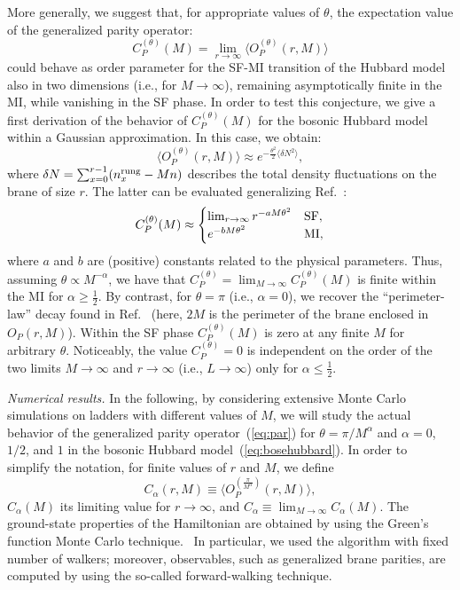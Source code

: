 \documentclass[aps,prb,floatfix,twocolumn,amsmath,amssymb]{revtex4}
\begin{document}
More generally, we suggest that, for appropriate values of $\theta$, the expectation value of the generalized parity operator:
\begin{equation}\label{eq:par}
C_P^{(\theta)}(M) = \lim_{r \to \infty} \langle O_P^{(\theta)} (r,M)\rangle
\end{equation}
could behave as order parameter for the SF-MI transition of the Hubbard model also in two dimensions (i.e., for $M \to \infty$), 
remaining asymptotically finite in the MI, while vanishing in the SF phase. In order to test this conjecture, we give a first 
derivation of the behavior of $C_P^{(\theta)}(M)$ for the bosonic Hubbard model within a Gaussian approximation. In this case, 
we obtain:
\begin{equation}\label{NLP2D}
\langle O_P^{(\theta)} (r,M) \rangle \approx e^{-\frac{\theta^2}{2}\langle\delta N^2\rangle},
\end{equation}
where $\delta N=\sum_{x=0}^{r-1}(n_x^{\rm rung}-Mn)$ describes the total density fluctuations on the brane of size $r$. 
The latter can be evaluated generalizing Ref.~:
\begin{equation}
\label{eq:Gauss}
C_P^{(\theta)}(M) \approx
\begin{cases} 
\lim_{r\to \infty} r^{-a M \theta^2} & {\rm SF}, \\
e^{-b M \theta^2}                    & {\rm MI},
\end{cases}
\end{equation}
where $a$ and $b$ are (positive) constants related to the physical parameters. Thus, assuming $\theta \propto M^{-\alpha}$, we
have that $C_P^{(\theta)} = \lim_{M \to \infty} C_P^{(\theta)}(M)$ is finite within the MI for $\alpha \ge \frac{1}{2}$. By contrast, 
for $\theta=\pi$ (i.e., $\alpha=0$), we recover the ``perimeter-law'' decay found in Ref.~ (here, $2M$ is 
the perimeter of the brane enclosed in $O_P(r,M)$). Within the SF phase $C_P^{(\theta)}(M)$ is zero at any finite $M$ for arbitrary 
$\theta$. Noticeably, the value $C_P^{(\theta)}=0$ is independent on the order of the two limits $M \to \infty$ and $r \to \infty$
(i.e., $L \to \infty$) only for $\alpha \leq \frac{1}{2}$.

{\it Numerical results.} In the following, by considering extensive Monte Carlo simulations on ladders with different values of $M$, we 
will study the actual behavior of the generalized parity operator~(\ref{eq:par}) for $\theta=\pi/M^{\alpha}$ and $\alpha=0$, $1/2$, and
$1$ in the bosonic Hubbard model~(\ref{eq:bosehubbard}). In order to simplify the notation, for finite values of $r$ and $M$, we define
\begin{equation} 
C_{\alpha}(r,M) \equiv \langle O_P^{(\frac{\pi}{M^\alpha})} (r,M)\rangle,
\end{equation} 
$C_{\alpha}(M)$ its limiting value for $r \to \infty$, and $C_\alpha \equiv \lim_{M\rightarrow\infty} C_\alpha(M)$.
The ground-state properties of the Hamiltonian are obtained by using the Green's function Monte Carlo technique.~\cite{Trivedi1990} 
In particular, we used the algorithm with fixed number of walkers; moreover, observables, such as generalized brane parities, are 
computed by using the so-called forward-walking technique.~\cite{Calandra1998}
\end{document}
